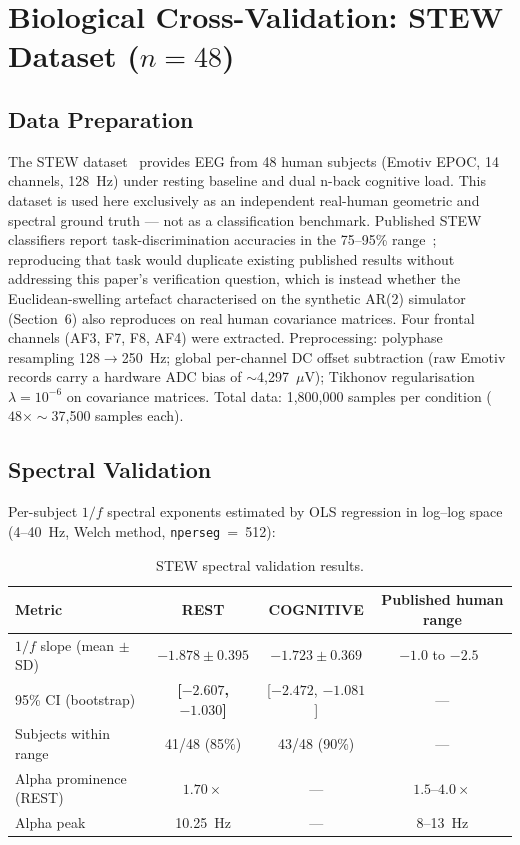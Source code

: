 \documentclass[11pt]{article}
\newcommand{\code}[1]{\texttt{#1}}
\begin{document}
\section{Biological Cross-Validation: STEW Dataset ($n = 48$)}

\subsection{Data Preparation}

The STEW dataset~\cite{lim2018} provides EEG from 48 human subjects (Emotiv EPOC, 14 channels, 128~Hz) under resting baseline and dual n-back cognitive load. This dataset is used here exclusively as an independent real-human geometric and spectral ground truth --- not as a classification benchmark. Published STEW classifiers report task-discrimination accuracies in the 75--95\% range~\cite{efficacy2022b}; reproducing that task would duplicate existing published results without addressing this paper's verification question, which is instead whether the Euclidean-swelling artefact characterised on the synthetic AR(2) simulator (Section~6) also reproduces on real human covariance matrices. Four frontal channels (AF3, F7, F8, AF4) were extracted. Preprocessing: polyphase resampling 128$\to$250~Hz; global per-channel DC offset subtraction (raw Emotiv records carry a hardware ADC bias of $\sim$4,297~$\mu$V); Tikhonov regularisation $\lambda = 10^{-6}$ on covariance matrices. Total data: 1,800,000 samples per condition ($48 \times \sim$37,500 samples each).

\subsection{Spectral Validation}

Per-subject $1/f$ spectral exponents estimated by OLS regression in log--log space (4--40~Hz, Welch method, \code{nperseg}~=~512):

\begin{table}[htbp]
\centering
\small
\caption{STEW spectral validation results.}
\begin{tabular}{lccc}
\toprule
Metric & REST & COGNITIVE & Published human range \\
\midrule
$1/f$ slope (mean $\pm$ SD) & \textbf{$-1.878 \pm 0.395$} & $-1.723 \pm 0.369$ & $-1.0$ to $-2.5$~\cite{klimesch1999} \\
95\% CI (bootstrap) & \textbf{[$-2.607$, $-1.030$]} & [$-2.472$, $-1.081$] & --- \\
Subjects within range & 41/48 (85\%) & 43/48 (90\%) & --- \\
Alpha prominence (REST) & \textbf{$1.70\times$} & --- & $1.5$--$4.0\times$ \\
Alpha peak & 10.25~Hz & --- & 8--13~Hz \\
\bottomrule
\end{tabular}

\end{table}
\end{document}
